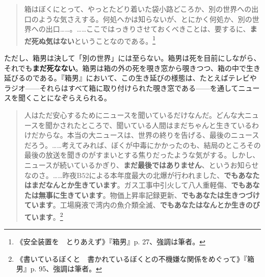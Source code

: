 \documentclass[a4paper]{jsarticle}
\begin{document}
\begin{quotation}
箱はぼくにとって、やっとたどり着いた袋小路どころか、別の世界への出口のような気さえする。何処へかは知らないが、とにかく何処か、別の世界への出口……。……ここではっきりさせておくべきことは、要するに、\textbf{まだ死ぬ気はない}ということなのである。\footnote{《安全装置を　とりあえず》『箱男』p. 27、強調は筆者。}
\end{quotation}

ただし、箱男は決して「別の世界」には至らない。箱男は死を目前にしながら、それでも\textbf{まだ死なない}。箱男は箱の外の死を覗き窓から覗きつつ、箱の中で生き延びるのである。『箱男』において、この生き延びの様態は、たとえばテレビやラジオ------それらはすべて箱に取り付けられた覗き窓である------を通してニュースを聞くことになぞらえられる。

\begin{quotation}
人はただ安心するためにニュースを聞いているだけなんだ。どんな大ニュースを聞かされたところで、聞いている人間はまだちゃんと生きているわけだからな。本当の大ニュースは、世界の終りを告げる、最後のニュースだろう。……考えてみれば、ぼくが中毒にかかったのも、結局のところその最後の放送を聞きのがすまいとする焦りだったような気がする。しかし、ニュースが続いているかぎり、\textbf{まだ最後ではありません}、というお知らせなのさ。……昨夜B52による本年度最大の北爆が行われました、\textbf{でもあなたはまだなんとか生きています}。ガス工事中引火して八人重軽傷、\textbf{でもあなたは無事に生きています}。物価上昇率記録更新、\textbf{でもあなたは生きつづけています}。工場廃液で湾内の魚介類全滅、\textbf{でもあなたはなんとか生きのびています}。\footnote{《書いているぼくと　書かれているぼくとの不機嫌な関係をめぐって》『箱男』p. 95、強調は筆者。}	
\end{quotation}
\end{document}
